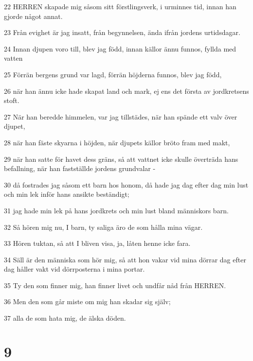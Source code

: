 \par 22 HERREN skapade mig såsom sitt förstlingsverk, i urminnes tid, innan han gjorde något annat.
\par 23 Från evighet är jag insatt, från begynnelsen, ända ifrån jordens urtidsdagar.
\par 24 Innan djupen voro till, blev jag född, innan källor ännu funnos, fyllda med vatten
\par 25 Förrän bergens grund var lagd, förrän höjderna funnos, blev jag född,
\par 26 när han ännu icke hade skapat land och mark, ej ens det första av jordkretsens stoft.
\par 27 När han beredde himmelen, var jag tillstädes, när han spände ett valv över djupet,
\par 28 när han fäste skyarna i höjden, när djupets källor bröto fram med makt,
\par 29 när han satte för havet dess gräns, så att vattnet icke skulle överträda hans befallning, när han fastställde jordens grundvalar -
\par 30 då fostrades jag såsom ett barn hos honom, då hade jag dag efter dag min lust och min lek inför hans ansikte beständigt;
\par 31 jag hade min lek på hans jordkrets och min lust bland människors barn.
\par 32 Så hören mig nu, I barn, ty saliga äro de som hålla mina vägar.
\par 33 Hören tuktan, så att I bliven visa, ja, låten henne icke fara.
\par 34 Säll är den människa som hör mig, så att hon vakar vid mina dörrar dag efter dag håller vakt vid dörrposterna i mina portar.
\par 35 Ty den som finner mig, han finner livet och undfår nåd från HERREN.
\par 36 Men den som går miste om mig han skadar sig själv;
\par 37 alla de som hata mig, de älska döden.

\chapter{9}

